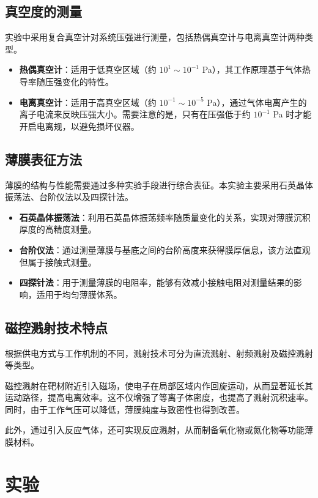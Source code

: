 \documentclass[a4paper, 1.5lines]{ctexart}
\begin{document}
\subsection{真空度的测量}

实验中采用复合真空计对系统压强进行测量，包括热偶真空计与电离真空计两种类型。

\begin{itemize}
    \item \textbf{热偶真空计}：适用于低真空区域（约 $10^{1}\sim10^{-1}$ Pa），其工作原理基于气体热导率随压强变化的特性。
    \item \textbf{电离真空计}：适用于高真空区域（约 $10^{-1}\sim10^{-5}$ Pa），通过气体电离产生的离子电流来反映压强大小。需要注意的是，只有在压强低于约 $10^{-1}$ Pa 时才能开启电离规，以避免损坏仪器。
\end{itemize}

\subsection{薄膜表征方法}

薄膜的结构与性能需要通过多种实验手段进行综合表征。本实验主要采用石英晶体振荡法、台阶仪法以及四探针法。

\begin{itemize}
    \item \textbf{石英晶体振荡法}：利用石英晶体振荡频率随质量变化的关系，实现对薄膜沉积厚度的高精度测量。
    \item \textbf{台阶仪法}：通过测量薄膜与基底之间的台阶高度来获得膜厚信息，该方法直观但属于接触式测量。
    \item \textbf{四探针法}：用于测量薄膜的电阻率，能够有效减小接触电阻对测量结果的影响，适用于均匀薄膜体系。
\end{itemize}

\subsection{磁控溅射技术特点}

根据供电方式与工作机制的不同，溅射技术可分为直流溅射、射频溅射及磁控溅射等类型。

磁控溅射在靶材附近引入磁场，使电子在局部区域内作回旋运动，从而显著延长其运动路径，提高电离效率。这不仅增强了等离子体密度，也提高了溅射沉积速率。同时，由于工作气压可以降低，薄膜纯度与致密性也得到改善。

此外，通过引入反应气体，还可实现反应溅射，从而制备氧化物或氮化物等功能薄膜材料。

    \section{实验}
    
\end{document}
